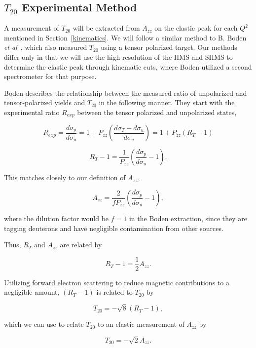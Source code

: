 \subsection{$T_{20}$ Experimental Method} %
\label{t20_exp}

A measurement of $T_{20}$ will be extracted from $A_{zz}$ on the elastic peak for each $Q^2$ mentioned in Section~\ref{kinematics}. We will follow a similar method to B. Boden \emph{et al}~\cite{Boden:1990una}, which also measured $T_{20}$ using a tensor polarized target. Our methods differ only in that we will use the high resolution of the HMS and SHMS to determine the elastic peak through kinematic cuts, where Boden utilized a second spectrometer for that purpose. 

Boden describes the relationship between the measured ratio of unpolarized and tensor-polarized yields and $T_{20}$ in the following manner. They start with the experimental ratio $R_{exp}$ between the tensor polarized and unpolarized states,

\begin{equation}
R_{exp}=\frac{d\sigma_p}{d\sigma_u}=1+P_{zz} \left( \frac{d\sigma_T-d\sigma_u}{d\sigma_u} \right) = 1+P_{zz} \left( R_T-1 \right) 
\end{equation}

\begin{equation}
R_T-1 = \frac{1}{P_{zz}} \left( \frac{d\sigma_p}{d\sigma_u} -1 \right).
\end{equation}

This matches closely to our definition of $A_{zz}$,

\begin{equation}
A_{zz}=\frac{2}{fP_{zz}}\left( \frac{d\sigma_p}{d\sigma_u}-1\right), \end{equation}

where the dilution factor would be $f=1$ in the Boden extraction, since they are tagging deuterons and have negligible contamination from other sources.

Thus, $R_T$ and $A_{zz}$ are related by

\begin{equation}
R_T-1=\frac{1}{2}A_{zz}.
\end{equation}

Utilizing forward electron scattering to reduce magnetic contributions to a negligible amount, $(R_T-1)$ is related to $T_{20}$ by

\begin{equation}
T_{20}=-\sqrt{8}(R_T-1),
\end{equation}

which we can use to relate $T_{20}$ to an elastic measurement of $A_{zz}$ by

\begin{equation}
T_{20}=-\sqrt{2}A_{zz}.
\end{equation}


